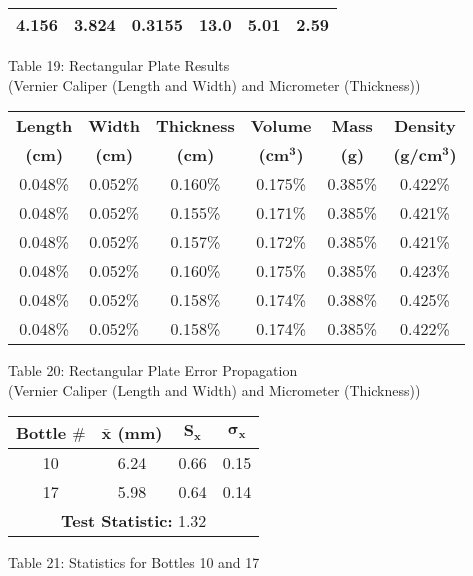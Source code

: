 \begin{center}
\begin{center}
\begin{tabular}{|c|c|c|c|c|c|}
        4.156 & 3.824 & 0.3155 & 13.0 & 5.01 & 2.59\\ \hline
    \end{tabular}
\end{center}
Table 19: Rectangular Plate Results \\(Vernier Caliper (Length and Width) and Micrometer (Thickness))
\begin{center}
    \begin{tabular}{|c|c|c|c|c|c|}
        \hline
        \textbf{Length} & \textbf{Width} & \textbf{Thickness} & \textbf{Volume} & \textbf{Mass} & \textbf{Density}\\
        \textbf{(cm)} & \textbf{(cm)} & \textbf{(cm)} & \textbf{($\bm{\textbf{cm}^3}$)} & \textbf{(g)} & \textbf{(g/$\bm{\textbf{cm}^3}$)}\\
        \hline
        0.048\% & 0.052\% & 0.160\% & 0.175\% & 0.385\% & 0.422\% \\ \hline
        0.048\% & 0.052\% & 0.155\% & 0.171\% & 0.385\% & 0.421\% \\ \hline
        0.048\% & 0.052\% & 0.157\% & 0.172\% & 0.385\% & 0.421\% \\ \hline
        0.048\% & 0.052\% & 0.160\% & 0.175\% & 0.385\% & 0.423\% \\ \hline
        0.048\% & 0.052\% & 0.158\% & 0.174\% & 0.388\% & 0.425\% \\ \hline
        0.048\% & 0.052\% & 0.158\% & 0.174\% & 0.385\% & 0.422\% \\ \hline
    \end{tabular}
\end{center}
Table 20: Rectangular Plate Error Propagation \\(Vernier Caliper (Length and Width) and Micrometer (Thickness))  \\  
\begin{center}
    \begin{tabular}{|c|c|c|c|}
        \hline
        \textbf{Bottle \(\bm{\#}\)} & \textbf{\(\bm{\bar{x}}\) (mm)} & \textbf{\(\bm{S_x}\)} & \textbf{ \(\bm{\sigma_x}\)} \\
        \hline
         10 & 6.24 & 0.66 & 0.15 \\ \hline
         17 & 5.98 & 0.64 & 0.14 \\ \hline
         \multicolumn{4}{|c|}{\textbf{Test Statistic: }1.32} \\
         \hline
    \end{tabular}
\end{center}
Table 21: Statistics for Bottles 10 and 17
\end{center}